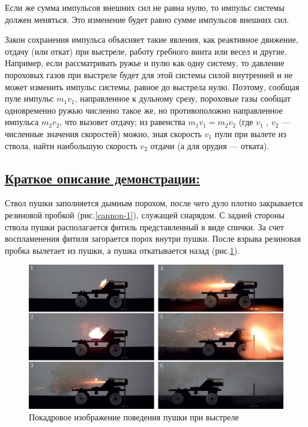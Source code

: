 \documentclass[14pt,a4paper,oneside]{extarticle}	%
\begin{document}
Если же сумма импульсов внешних сил не равна нулю, то импульс системы должен меняться. 
Это изменение будет равно сумме импульсов внешних сил.

Закон сохранения импульса объясняет такие явления, как реактивное движение, отдачу (или откат) при выстреле, работу гребного винта или весел и другие.
Например, если рассматривать ружье и пулю как одну систему, то давление пороховых газов при выстреле будет для этой системы силой внутренней и не может изменить импульс системы, равное до выстрела нулю. Поэтому, сообщая пуле импульс $ m_{1}v_{1} $, направленное к дульному срезу, пороховые газы сообщат одновременно ружью численно такое же, но противоположно направленное импульса $ m_{2}v_{2} $, что вызовет отдачу; из равенства  $ m_{1}v_{1} = m_{2}v_{2} $ (где $ v_{1} $ , $ v_{2} $ — численные значения скоростей) можно, зная скорость $ v_{1} $ пули при вылете из ствола, найти наибольшую скорость $ v_{2} $ отдачи (а для орудия — отката).

\newpage
\subsection*{\underline{Краткое описание демонстрации:}}

Ствол пушки заполняется дымным порохом, после чего дуло плотно закрывается резиновой пробкой (рис.\ref{cannon-1}), служащей снарядом.
С задней стороны ствола пушки располагается фитиль представленный в виде спички.
За счет воспламенения фитиля загорается порох внутри пушки.
После взрыва резиновая пробка вылетает из пушки, а пушка откатывается назад (рис.\ref{cannon-2}).

\begin{figure}[H] 
	\centering 	
	\includegraphics[width=0.9\linewidth]{cannon-2.png}
	\caption{Покадровое изображение поведения пушки при выстреле}
	\label{cannon-2}
\end{figure}
\end{document}
